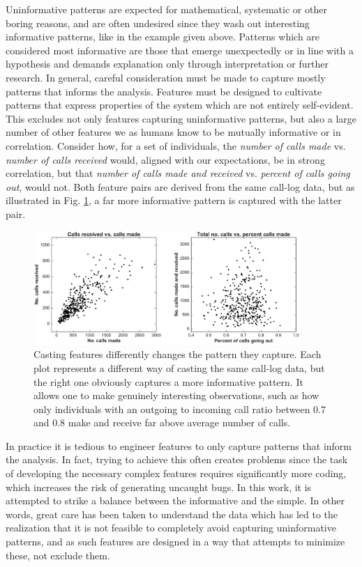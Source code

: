 Uninformative patterns are expected for mathematical, systematic or other boring reasons, and are often undesired since they wash out interesting informative patterns, like in the example given above. Patterns which are considered most informative are those that emerge unexpectedly or in line with a hypothesis and demands explanation only through interpretation or further research. In general, careful consideration must be made to capture mostly patterns that informs the analysis. Features must be designed to cultivate patterns that express properties of the system which are not entirely self-evident. This excludes not only features capturing uninformative patterns, but also a large number of other features we as humans know to be mutually informative or in correlation. Consider how, for a set of individuals, the \textit{number of calls made} vs. \textit{number of calls received} would, aligned with our expectations, be in strong correlation, but that \textit{number of calls made and received} vs. \textit{percent of calls going out}, would not. Both feature pairs are derived from the same call-log data, but as illustrated in Fig. \ref{fig:example_informative_features}, a far more informative pattern is captured with the latter pair.

\begin{figure}[h!]
	\centering
	\includegraphics[width=0.9\textwidth]{figures/example_informative_features}
	\caption{\label{fig:example_informative_features} Casting features differently changes the pattern they capture. Each plot represents a different way of casting the same call-log data, but the right one obviously captures a more informative pattern. It allows one to make genuinely interesting observations, such as how only individuals with an outgoing to incoming call ratio between 0.7 and 0.8 make and receive far above average number of calls.}
\end{figure}

In practice it is tedious to engineer features to only capture patterns that inform the analysis. In fact, trying to achieve this often creates problems since the task of developing the necessary complex features requires significantly more coding, which increases the risk of generating uncaught bugs. In this work, it is attempted to strike a balance between the informative and the simple. In other words, great care has been taken to understand the data which has led to the realization that it is not feasible to completely avoid capturing uninformative patterns, and as such features are designed in a way that attempts to minimize these, not exclude them.